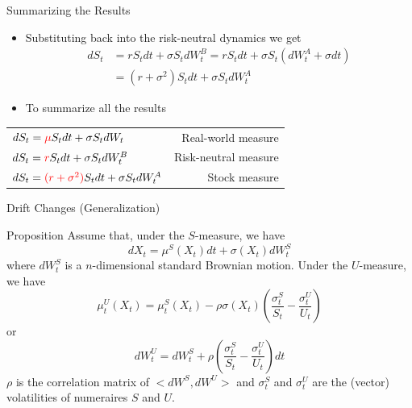 \documentclass{beamer}
\begin{document}
\begin{frame}{Summarizing the Results}
\begin{itemize}
	\item Substituting back into the risk-neutral dynamics we get
	\begin{equation*}
		\begin{aligned}
		dS_t &= r S_t dt + \sigma S_t dW_t^B = 
		rS_t dt + \sigma S_t (dW_t^A + \sigma dt) \\
		& = (r + \sigma^2)S_t dt + \sigma S_t dW^A_t
		\end{aligned}
	\end{equation*}

	\item To summarize all the results
	\end{itemize}

	\begin{table}
		\begin{tabular}{lr}
		$dS_t = \textcolor{red}{\mu} S_t dt + \sigma S_t dW_t$ & Real-world measure \\
		$dS_t = \textcolor{red}{r}S_t dt + \sigma S_t dW_t^B$ & Risk-neutral measure \\
		$dS_t = \textcolor{red}{(r + \sigma^2)}S_t dt + \sigma S_t dW^A_t$ & Stock measure\\
		\end{tabular}
	\end{table}
\end{frame}


\begin{frame}{Drift Changes (Generalization)}
	\begin{block}{Proposition}
	Assume that, under the $S$-measure, we have
	\begin{equation*}
	dX_t = \mu^S(X_t)dt + \sigma(X_t)dW^S_t
	\end{equation*}
	where $dW^S_t$ is a $n$-dimensional standard Brownian motion. Under the $U$-measure, we have
	\begin{equation}
	\mu^U_t(X_t) = \mu^S_t(X_t) - \rho\sigma(X_t)\left(\frac{\sigma^S_t}{S_t}-\frac{\sigma^U_t}{U_t}\right)
	\end{equation}
	or
	\begin{equation}
	dW^U_t = dW^S_t + \rho\left(\frac{\sigma^S_t}{S_t}-\frac{\sigma^U_t}{U_t}\right) dt
	\end{equation}
	$\rho$ is the correlation matrix of $<dW^S,dW^U>$ and $\sigma^S_t$ and $\sigma^U_t$ are the (vector) volatilities of numeraires $S$ and $U$. %
	\end{block}
\end{frame}
\end{document}
